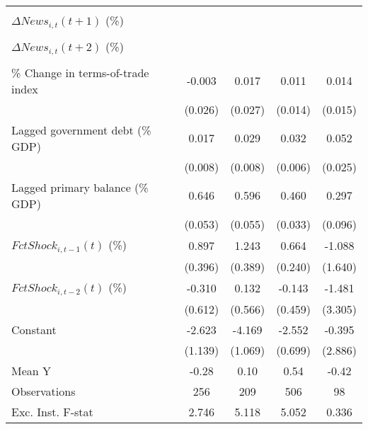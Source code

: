 {\begin{tabular}{l*{4}{c}}
                    &                     &                     &                     &                     \\
\addlinespace
$ \Delta News_{i,t}(t+1)$ (\%)&                     &                     &                     &                     \\
                    &                     &                     &                     &                     \\
\addlinespace
$ \Delta News_{i,t}(t+2)$ (\%)&                     &                     &                     &                     \\
                    &                     &                     &                     &                     \\
\addlinespace
\% Change in terms-of-trade index&      -0.003         &       0.017         &       0.011         &       0.014         \\
                    &     (0.026)         &     (0.027)         &     (0.014)         &     (0.015)         \\
\addlinespace
Lagged government debt (\% GDP)&       0.017\sym{*}  &       0.029\sym{***}&       0.032\sym{***}&       0.052\sym{*}  \\
                    &     (0.008)         &     (0.008)         &     (0.006)         &     (0.025)         \\
\addlinespace
Lagged primary balance (\% GDP)&       0.646\sym{***}&       0.596\sym{***}&       0.460\sym{***}&       0.297\sym{***}\\
                    &     (0.053)         &     (0.055)         &     (0.033)         &     (0.096)         \\
\addlinespace
$ FctShock_{i,t-1}(t)$ (\%)&       0.897\sym{**} &       1.243\sym{***}&       0.664\sym{***}&      -1.088         \\
                    &     (0.396)         &     (0.389)         &     (0.240)         &     (1.640)         \\
\addlinespace
$ FctShock_{i,t-2}(t)$ (\%)&      -0.310         &       0.132         &      -0.143         &      -1.481         \\
                    &     (0.612)         &     (0.566)         &     (0.459)         &     (3.305)         \\
\addlinespace
Constant            &      -2.623\sym{**} &      -4.169\sym{***}&      -2.552\sym{***}&      -0.395         \\
                    &     (1.139)         &     (1.069)         &     (0.699)         &     (2.886)         \\
\midrule
Mean Y              &       -0.28         &        0.10         &        0.54         &       -0.42         \\
Observations        &         256         &         209         &         506         &          98         \\
Exc. Inst. F-stat   &       2.746         &       5.118         &       5.052         &       0.336         \\
\bottomrule
\end{tabular}
}
